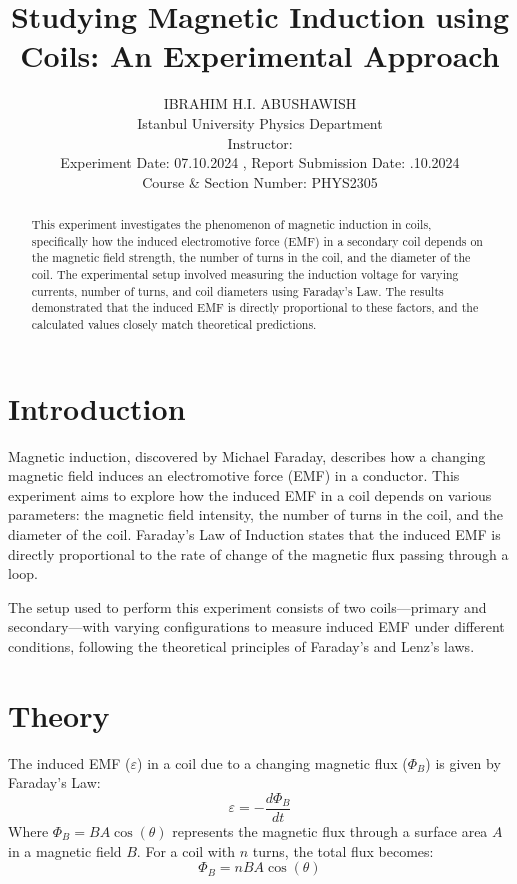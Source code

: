 \documentclass[journal]{IEEEtran}
\begin{document}
\title{Studying Magnetic Induction using Coils: An Experimental Approach}
\author{IBRAHIM H.I. ABUSHAWISH\\
Istanbul University Physics Department\\
Instructor: \hspace{10px} \\
Experiment Date: 07.10.2024 , Report Submission Date:  .10.2024\\
Course \& Section Number: PHYS2305}

\maketitle

\begin{abstract}
    This experiment investigates the phenomenon of magnetic induction in coils, specifically how the induced electromotive force (EMF) in a secondary coil depends on the magnetic field strength, the number of turns in the coil, and the diameter of the coil. The experimental setup involved measuring the induction voltage for varying currents, number of turns, and coil diameters using Faraday's Law. The results demonstrated that the induced EMF is directly proportional to these factors, and the calculated values closely match theoretical predictions.
\end{abstract}

\section{Introduction}
Magnetic induction, discovered by Michael Faraday, describes how a changing magnetic field induces an electromotive force (EMF) in a conductor. This experiment aims to explore how the induced EMF in a coil depends on various parameters: the magnetic field intensity, the number of turns in the coil, and the diameter of the coil. Faraday’s Law of Induction states that the induced EMF is directly proportional to the rate of change of the magnetic flux passing through a loop.

The setup used to perform this experiment consists of two coils—primary and secondary—with varying configurations to measure induced EMF under different conditions, following the theoretical principles of Faraday's and Lenz's laws.

\section{Theory}
The induced EMF (\(\varepsilon\)) in a coil due to a changing magnetic flux (\(\Phi_B\)) is given by Faraday’s Law:
\begin{equation}
    \varepsilon = - \frac{d\Phi_B}{dt}
\end{equation}
Where \(\Phi_B = B A \cos(\theta)\) represents the magnetic flux through a surface area \(A\) in a magnetic field \(B\). For a coil with \(n\) turns, the total flux becomes:
\begin{equation}
    \Phi_B = n B A \cos(\theta)
\end{equation}
\end{document}
